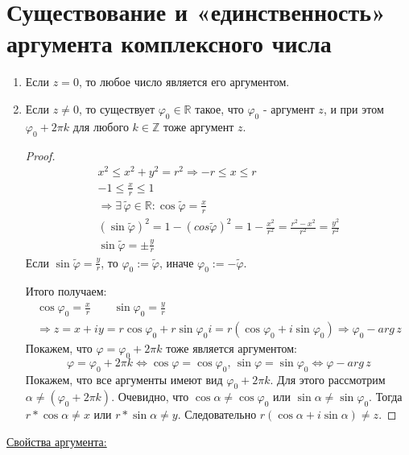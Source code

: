 \section{Существование и «единственность» аргумента комплексного числа}
\begin{enumerate}
    \item Если $z = 0$, то любое число является его аргументом.
    \item Если $z \neq 0$, то существует $\varphi_0 \in \mathbb{R}$ такое, что $\varphi_0$ - аргумент $z$, и при этом $\varphi_0 + 2\pi k$ для любого $k \in \mathbb{Z}$ тоже аргумент $z$.
    \begin{proof} 
        \begin{gather*}
            x^2 \leqslant x^2 + y^2 = r^2 \Rightarrow -r \leqslant x \leqslant r \\
            -1 \leqslant \frac{x}{r} \leqslant 1 \\
            \Rightarrow \exists\, \widetilde{\varphi} \in \mathbb{R} : \cos\widetilde{\varphi} = \frac{x}{r} \\
            (\sin\widetilde{\varphi})^2 = 1 - (cos\widetilde{\varphi})^2 = 1 - \frac{x^2}{r^2} = \frac{r^2 - x^2}{r^2} = \frac{y^2}{r^2} \\
            \sin\widetilde{\varphi} = \pm\frac{y}{r}
        \end{gather*}
        Если $\sin\widetilde{\varphi} = \frac{y}{r}$, то $\varphi_0 := \widetilde{\varphi}$, иначе $\varphi_0 := -\widetilde{\varphi}$.
  
        Итого получаем:
        \begin{gather*}
            \cos\varphi_0 = \frac{x}{r} \quad\quad \sin\varphi_0 = \frac{y}{r} \\
            \Rightarrow z = x + iy = r\cos\varphi_0 + r\sin\varphi_0i = r(\cos\varphi_0 + i\sin\varphi_0) \Rightarrow \varphi_0 - arg\,z
        \end{gather*}
        Покажем, что $\varphi = \varphi_0 + 2\pi k$ тоже является аргументом:
        \[ \varphi = \varphi_0 + 2\pi k \Leftrightarrow \cos\varphi = \cos\varphi_0,\, \sin\varphi = \sin\varphi_0 \Leftrightarrow \varphi - arg\,z \]
        Покажем, что все аргументы имеют вид $\varphi_0 + 2\pi k$. Для этого рассмотрим $\alpha \neq (\varphi_0 + 2\pi k)$. 
        Очевидно, что $\cos\alpha \neq \cos\varphi_0$ или $\sin\alpha \neq \sin\varphi_0$. Тогда $r * \cos\alpha \neq x$ или $r * \sin\alpha \neq y$. 
        Следовательно $r(\cos\alpha + i\sin\alpha) \neq z$.
    \end{proof}
\end{enumerate}
\underline{Свойства аргумента:}  
  
